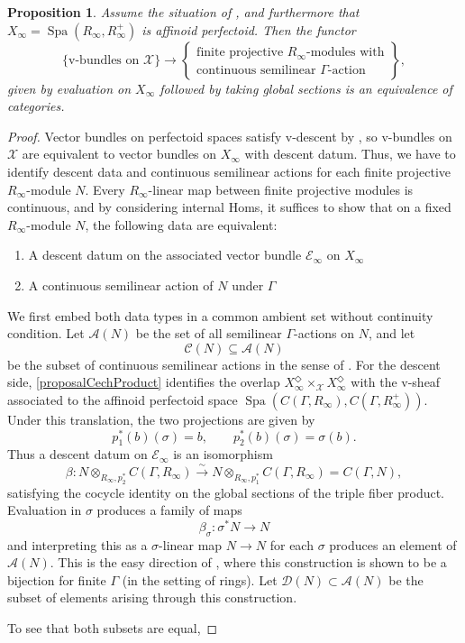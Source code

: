 \documentclass[10pt,twoside]{article}
\numberwithin{equation}{section}
\theoremstyle{plain}
\newtheorem{myprop}[mythm]{Proposition}
\theoremstyle{definition}
\DeclareMathOperator{\Spa}{Spa}
\newcommand{\MCE}{\mathcal{E}}
\newcommand{\MCX}{\mathcal{X}}
\let \diamond \Diamond
\begin{document}
\begin{myprop}\label{proposalGeometricSemilinear}
Assume the situation of , and furthermore that \(X_\infty=\Spa(R_\infty,R_\infty^+)\) is affinoid perfectoid. Then the functor
\[
\{\text{v-bundles on }\MCX\}\longrightarrow
\left\{\begin{gathered}
\text{finite projective }R_\infty\text{-modules with}\\
\text{continuous semilinear }\Gamma\text{-action}
\end{gathered}\right\},
\]
given by evaluation on \(X_\infty\) followed by taking global sections is an equivalence of categories.
\end{myprop}
\begin{proof}
Vector bundles on perfectoid spaces satisfy v-descent by \cite[Lemma 17.1.8]{SW20}, so v-bundles on \(\MCX\) are equivalent to vector bundles on \(X_\infty\) with descent datum. Thus, we have to identify descent data and continuous semilinear actions for each finite projective \(R_\infty\)-module \(N\). Every \(R_\infty\)-linear map between finite projective modules is continuous, and by considering internal Homs, it suffices to show that on a fixed \(R_\infty\)-module \(N\), the following data are equivalent:
\begin{enumerate}
	\item A descent datum on the associated vector bundle \(\MCE_\infty\) on \(X_\infty\)
	\item A continuous semilinear action of \(N\) under \(\Gamma\)
\end{enumerate}

We first embed both data types in a common ambient set without continuity condition. Let \(\mathscr A(N)\) be the set of all semilinear \(\Gamma\)-actions on \(N\), and let
\[
\mathscr C(N)\subseteq\mathscr A(N)
\]
be the subset of continuous semilinear actions in the sense of . For the descent side, \eqref{proposalCechProduct} identifies the overlap \(X_\infty^\diamond\times_{\MCX}X_\infty^\diamond\) with the v-sheaf associated to the affinoid perfectoid space \(\Spa(C(\Gamma,R_\infty),C(\Gamma,R_\infty^+))\). Under this translation, the two projections are given by
\[
p_1^*(b)(\sigma)=b,\qquad p_2^*(b)(\sigma)=\sigma(b).
\]
Thus a descent datum on \(\MCE_\infty\) is an isomorphism
\[
\beta\colon N\otimes_{R_\infty,p_2^*}C(\Gamma,R_\infty)\xrightarrow{\sim}
N\otimes_{R_\infty,p_1^*}C(\Gamma,R_\infty)=C(\Gamma,N),
\]
satisfying the cocycle identity on the global sections of the triple fiber product. Evaluation in \(\sigma\) produces a family of maps
\[\beta_\sigma\colon \sigma^* N\longrightarrow N \]
and interpreting this as a \(\sigma\)-linear map \(N\to N\) for each \(\sigma\) produces an element of \(\mathscr A(N)\). This is the easy direction of \cite[0CDQ]{Stacks}, where this construction is shown to be a bijection for finite \(\Gamma\) (in the setting of rings). Let \(\mathscr D(N)\subset \mathscr A(N)\) be the subset of elements arising through this construction.\par
To see that both subsets are equal, 


\end{proof}
\end{document}
